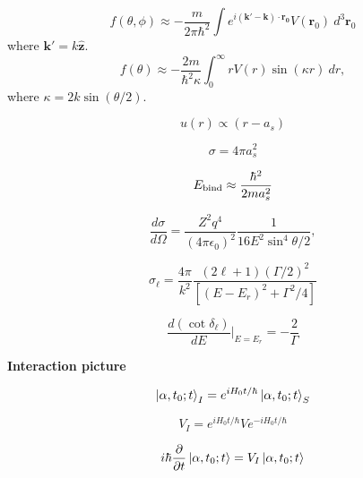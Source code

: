 \documentclass[11pt]{article}
\newcommand{\vect}[1]{\boldsymbol{\mathbf{#1}}}
\begin{document}
\begin{multicols}{2}
\begin{equation}
f(\theta,\phi) \approx - \frac{m}{2\pi\hbar^2}
                 \int e^{i(\vect{k'}-\vect{k}) \cdot \vect{r_0}} V(\vect{r}_0)
                      \: d^3 \vect{r}_0
\end{equation}
where $\vect{k'} = k \vect{\hat{z}}$.
\begin{equation}
f(\theta) \approx - \frac{2m}{\hbar^2 \kappa}
          \int_{0}^{\infty} r V(r) \sin(\kappa r) \: dr,
\end{equation}
where $\kappa = 2 k \sin(\theta/2)$.

\begin{equation}
u(r) \propto (r - a_s)
\end{equation}

\begin{equation}
\sigma = 4\pi a_s^2
\end{equation}

\begin{equation}
E_{\rm bind} \approx \frac{\hbar^2}{2ma_s^2}
\end{equation}

\begin{equation}
  \frac{d\sigma}{d\Omega} = \frac{Z^2 q^4}{(4\pi\epsilon_0)^2}
  \frac{1}{16E^2 \sin^4 \theta/2} ,
\end{equation}

\begin{equation}
  \sigma_{\ell} = \frac{4\pi}{k^2}
                  \frac{(2\ell+1)(\Gamma/2)^2}{[(E-E_r)^2+\Gamma^2/4]}
\end{equation}

\begin{equation}
\frac{d(\cot \delta_{\ell})}{dE} \bigg\rvert_{E=E_r} = - \frac{2}{\Gamma}
\end{equation}


{\bf Interaction picture}

\begin{equation} %
\ket{\alpha,t_0;t}_{I} =
  e^{iH_0t/\hbar} \ket{\alpha,t_0;t}_{S}
\end{equation}

\begin{equation} %
V_I = e^{iH_0t/\hbar}Ve^{-iH_0t/\hbar}
\end{equation}

\begin{equation} %
i\hbar \frac{\partial}{\partial t} \ket{\alpha,t_0;t} = V_I \ket{\alpha,t_0;t}
\end{equation}


\end{multicols}
\end{document}
